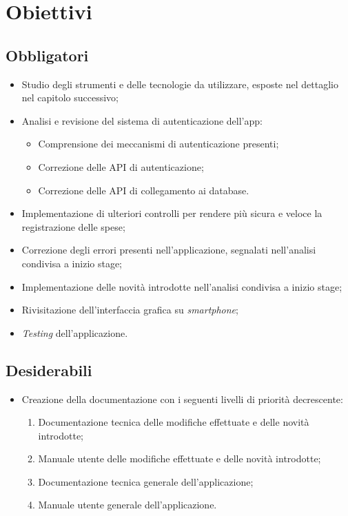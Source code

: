 \section{Obiettivi}
\label{cap:obiettivi}
\subsection{Obbligatori}

\begin{itemize}
    \item Studio degli strumenti e delle tecnologie da utilizzare, esposte nel dettaglio nel capitolo successivo;
    \item Analisi e revisione del sistema di autenticazione dell'app:
    \begin{itemize}
        \item Comprensione dei meccanismi di autenticazione presenti;
        \item Correzione delle \gls{API} di autenticazione;
        \item Correzione delle \gls{API} di collegamento ai database.
    \end{itemize}
    \item Implementazione di ulteriori controlli per rendere più sicura e veloce la registrazione delle spese;
    \item Correzione degli errori presenti nell'applicazione, segnalati nell'analisi condivisa a inizio stage;
    \item Implementazione delle novità introdotte nell'analisi condivisa a inizio stage;
    \item Rivisitazione dell'interfaccia grafica su \textit{smartphone};
    \item \textit{Testing} dell'applicazione.
\end{itemize}

\subsection{Desiderabili}

\begin{itemize}
    \item Creazione della documentazione con i seguenti livelli di priorità decrescente:
    \begin{enumerate}
        \item Documentazione tecnica delle modifiche effettuate e delle novità introdotte;
        \item Manuale utente delle modifiche effettuate e delle novità introdotte;
        \item Documentazione tecnica generale dell'applicazione;
        \item Manuale utente generale dell'applicazione.
    \end{enumerate}
\end{itemize}

